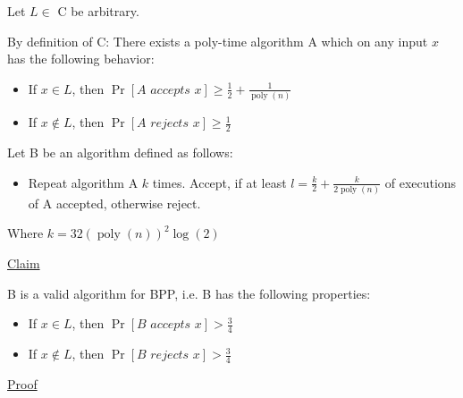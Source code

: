 Let $L \in$ C be arbitrary.

By definition of C: There exists a poly-time algorithm A which on any input $x$ has the following behavior:

\begin{itemize}
    \item If $x \in L$, then $\operatorname{Pr}[\textit{A accepts } x] \geq \frac{1}{2} + \frac{1}{\operatorname{poly}(n)}$
    
    \item If $x \notin L$, then $\operatorname{Pr}[\textit{A rejects } x] \geq \frac{1}{2}$
\end{itemize}

Let B be an algorithm defined as follows:

\begin{itemize}
    \item Repeat algorithm A $k$ times. Accept, if at least $l = \frac{k}{2} + \frac{k}{2 \operatorname{poly}(n)}$ of executions of A accepted, otherwise reject.
\end{itemize}

Where $k = 32(\operatorname{poly}(n))^2\operatorname{log}(2)$

\underline{Claim}

B is a valid algorithm for BPP, i.e. B has the following properties:

\begin{itemize}
    \item If $x \in L$, then $\operatorname{Pr}[\textit{B accepts } x] > \frac{3}{4}$
    
    \item If $x \notin L$, then $\operatorname{Pr}[\textit{B rejects } x] > \frac{3}{4}$
\end{itemize}

\underline{Proof}

